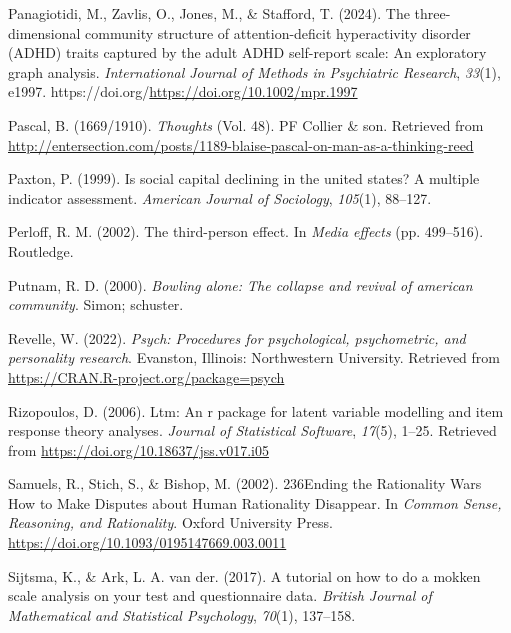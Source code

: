 \documentclass[
  ,jou,floatsintext]{apa6}
\newlength{\cslhangindent}
\newlength{\cslentryspacingunit} %
\newenvironment{CSLReferences}[2] %
 {%
  \setlength{\parindent}{0pt}
  \ifodd #1
  \let\oldpar\par
  \def\par{\hangindent=\cslhangindent\oldpar}
  \fi
  \setlength{\parskip}{#2\cslentryspacingunit}
 }%
 {}
\begin{document}
\begin{CSLReferences}{1}{0}
\leavevmode{}%
Panagiotidi, M., Zavlis, O., Jones, M., \& Stafford, T. (2024). The three-dimensional community structure of attention-deficit hyperactivity disorder (ADHD) traits captured by the adult ADHD self-report scale: An exploratory graph analysis. \emph{International Journal of Methods in Psychiatric Research}, \emph{33}(1), e1997. https://doi.org/\url{https://doi.org/10.1002/mpr.1997}

\leavevmode{}%
Pascal, B. (1669/1910). \emph{Thoughts} (Vol. 48). PF Collier \& son. Retrieved from \url{http://entersection.com/posts/1189-blaise-pascal-on-man-as-a-thinking-reed}

\leavevmode{}%
Paxton, P. (1999). Is social capital declining in the united states? A multiple indicator assessment. \emph{American Journal of Sociology}, \emph{105}(1), 88--127.

\leavevmode{}%
Perloff, R. M. (2002). The third-person effect. In \emph{Media effects} (pp. 499--516). Routledge.

\leavevmode{}%
Putnam, R. D. (2000). \emph{Bowling alone: The collapse and revival of american community}. Simon; schuster.

\leavevmode{}%
Revelle, W. (2022). \emph{Psych: Procedures for psychological, psychometric, and personality research}. Evanston, Illinois: Northwestern University. Retrieved from \url{https://CRAN.R-project.org/package=psych}

\leavevmode{}%
Rizopoulos, D. (2006). Ltm: An r package for latent variable modelling and item response theory analyses. \emph{Journal of Statistical Software}, \emph{17}(5), 1--25. Retrieved from \url{https://doi.org/10.18637/jss.v017.i05}

\leavevmode{}%
Samuels, R., Stich, S., \& Bishop, M. (2002). {236Ending the Rationality Wars How to Make Disputes about Human Rationality Disappear}. In \emph{{Common Sense, Reasoning, and Rationality}}. Oxford University Press. \url{https://doi.org/10.1093/0195147669.003.0011}

\leavevmode{}%
Sijtsma, K., \& Ark, L. A. van der. (2017). A tutorial on how to do a mokken scale analysis on your test and questionnaire data. \emph{British Journal of Mathematical and Statistical Psychology}, \emph{70}(1), 137--158.


\end{CSLReferences}
\end{document}
